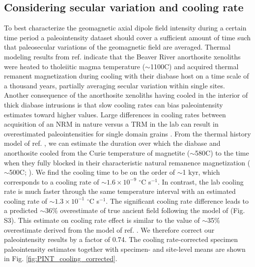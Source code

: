 \documentclass[9pt,twocolumn,twoside,lineno]{pnas-new}
\begin{document}
\subsection*{Considering secular variation and cooling rate}
To best characterize the geomagnetic axial dipole field intensity during a certain time period a paleointensity dataset should cover a sufficient amount of time such that paleosecular variations of the geomagnetic field are averaged. Thermal modeling results from ref. \citealp{Zhang2021b} indicate that the Beaver River anorthosite xenoliths were heated to tholeiitic magma temperature ($\sim$1100\textdegree C) and acquired thermal remanent magnetization during cooling with their diabase host on a time scale of a thousand years, partially averaging secular variation within single sites. Another consequence of the anorthosite xenoliths having cooled in the interior of thick diabase intrusions is that slow cooling rates can bias paleointensity estimates toward higher values. Large differences in cooling rates between acquisition of an NRM in nature versus a TRM in the lab can result in overestimated paleointensities for single domain grains \cite{Dodson1980a, Halgedahl1980a, Nagy2021a}. From the thermal history model of ref.  \citealp{Zhang2021b}, we can estimate the duration over which the diabase and anorthosite cooled from the Curie temperature of magnetite ($\sim$580\textdegree C) to the time when they fully blocked in their characteristic natural remanence magnetization ($\sim$500\textdegree C;  \citealp{Zhang2021b}). We find the cooling time to be on the order of $\sim$1 kyr, which corresponds to a cooling rate of $\sim1.6\times10^{-9}$ $^\circ$C s$^{-1}$. In contrast, the lab cooling rate is much faster through the same temperature interval with an estimated cooling rate of $\sim1.3\times10^{-1}$ $^\circ$C s$^{-1}$. The significant cooling rate difference leads to a predicted $\sim$36\% overestimate of true ancient field following the model of \citealp{Halgedahl1980a} (Fig. S3). This estimate on cooling rate effect is similar to the value of $\sim$35\% overestimate derived from the model of ref. \citealp{Nagy2021a}. We therefore correct our paleointensity results by a factor of 0.74. The cooling rate-corrected specimen paleointensity estimates together with specimen- and site-level means are shown in Fig. \ref{fig:PINT_cooling_corrected}.
\end{document}
